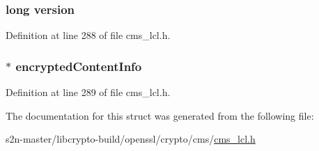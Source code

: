 \subsubsection[{\texorpdfstring{version}{version}}]{\setlength{\rightskip}{0pt plus 5cm}long version}\hypertarget{struct_c_m_s___encrypted_data__st_a17afc5cf84cee4b2123665f28ce85c9f}{}\label{struct_c_m_s___encrypted_data__st_a17afc5cf84cee4b2123665f28ce85c9f}


Definition at line 288 of file cms\+\_\+lcl.\+h.

\subsubsection[{\texorpdfstring{encrypted\+Content\+Info}{encryptedContentInfo}}]{$\ast$ encrypted\+Content\+Info}\hypertarget{struct_c_m_s___encrypted_data__st_ad4da71b66cde0fa01706c19ae122dc53}{}\label{struct_c_m_s___encrypted_data__st_ad4da71b66cde0fa01706c19ae122dc53}


Definition at line 289 of file cms\+\_\+lcl.\+h.



The documentation for this struct was generated from the following file\+:\begin{DoxyCompactItemize}
\item 
s2n-\/master/libcrypto-\/build/openssl/crypto/cms/\hyperlink{cms__lcl_8h}{cms\+\_\+lcl.\+h}\end{DoxyCompactItemize}
